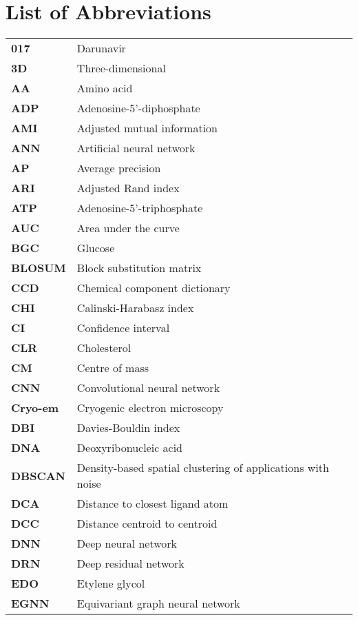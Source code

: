 \chapter*{List of Abbreviations}

\begin{longtable}[l]{@{}p{2.5cm}p{12cm}@{}}
\textbf{017} & Darunavir \\
\textbf{3D} & Three-dimensional \\
\textbf{AA} & Amino acid \\
\textbf{ADP} & Adenosine-5'-diphosphate \\
\textbf{AMI} & Adjusted mutual information \\
\textbf{ANN} & Artificial neural network \\
\textbf{AP} & Average precision \\
\textbf{ARI} & Adjusted Rand index \\
\textbf{ATP} & Adenosine-5’-triphosphate \\
\textbf{AUC} & Area under the curve \\
\textbf{BGC} & Glucose \\
\textbf{BLOSUM} & Block substitution matrix \\
\textbf{CCD} & Chemical component dictionary \\
\textbf{CHI} & Calinski-Harabasz index \\
\textbf{CI} & Confidence interval \\
\textbf{CLR} & Cholesterol \\
\textbf{CM} & Centre of mass \\
\textbf{CNN} & Convolutional neural network \\
\textbf{Cryo-em} & Cryogenic electron microscopy \\
\textbf{DBI} & Davies-Bouldin index \\
\textbf{DNA} & Deoxyribonucleic acid \\
\textbf{DBSCAN} & Density-based spatial clustering of applications with noise \\
\textbf{DCA} & Distance to closest ligand atom \\
\textbf{DCC} & Distance centroid to centroid \\
\textbf{DNN} & Deep neural network \\
\textbf{DRN} & Deep residual network \\
\textbf{EDO} & Etylene glycol \\
\textbf{EGNN} & Equivariant graph neural network \\

\end{longtable}
